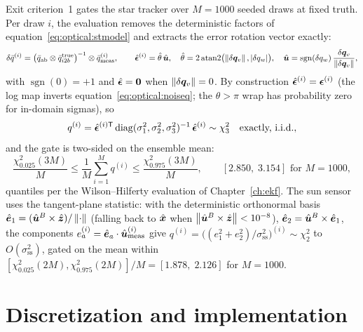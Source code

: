 Exit criterion~1 gates the star tracker over $M = 1000$ seeded draws at
fixed truth. Per draw $i$, the evaluation removes the deterministic
factors of equation~\eqref{eq:optical:stmodel} and extracts the error
rotation vector exactly:
\begin{equation}
  \delta\bar{q}^{(i)}
    = \bigl(\bar{q}_{\mathrm{ab}} \otimes
        \bar{q}_{i2b}^{\mathrm{true}}\bigr)^{-1}
      \otimes \bar{q}_{\mathrm{meas}}^{(i)},
  \qquad
  \hat{\bm{\epsilon}}^{(i)}
    = \hat\theta\,\hat{\bm{u}},\quad
  \hat\theta = 2\operatorname{atan2}\bigl(\left\lVert \delta\bm{q}_v \right\rVert,
    |\delta q_w|\bigr),\quad
  \hat{\bm{u}} = \operatorname{sgn}(\delta q_w)\,
    \frac{\delta\bm{q}_v}{\left\lVert \delta\bm{q}_v \right\rVert},
  \label{eq:optical:extract}
\end{equation}
with $\operatorname{sgn}(0) = +1$ and $\hat{\bm{\epsilon}} = \bm{0}$
when $\left\lVert \delta\bm{q}_v \right\rVert = 0$. By construction
$\hat{\bm{\epsilon}}^{(i)} = \bm{\epsilon}^{(i)}$ (the log map inverts
equation~\eqref{eq:optical:noiseq}; the $\theta > \pi$ wrap has
probability zero for in-domain sigmas), so
\begin{equation}
  q^{(i)} = \hat{\bm{\epsilon}}^{(i)\mathsf T}\,
    \mathrm{diag}(\sigma_1^2, \sigma_2^2, \sigma_3^2)^{-1}\,
    \hat{\bm{\epsilon}}^{(i)} \sim \chi^2_3
  \quad\text{exactly, i.i.d.},
  \label{eq:optical:ststat}
\end{equation}
and the gate is two-sided on the ensemble mean:
\begin{equation}
  \frac{\chi^2_{0.025}(3M)}{M}
    \le \frac{1}{M}\sum_{i=1}^{M} q^{(i)}
    \le \frac{\chi^2_{0.975}(3M)}{M},
  \qquad
  [2.850,\; 3.154] \text{ for } M = 1000 ,
  \label{eq:optical:stbounds}
\end{equation}
quantiles per the Wilson--Hilferty evaluation of
Chapter~\ref{ch:ekf}. The sun sensor uses the tangent-plane statistic:
with the deterministic orthonormal basis $\hat{\bm{e}}_1 =
(\hat{\bm{u}}^{B} \times \hat{\bm{z}})/\left\lVert \cdot \right\rVert$ (falling back to
$\hat{\bm{x}}$ when $\left\lVert \hat{\bm{u}}^{B} \times \hat{\bm{z}} \right\rVert <
10^{-8}$), $\hat{\bm{e}}_2 = \hat{\bm{u}}^{B} \times \hat{\bm{e}}_1$,
the components $e_a^{(i)} = \hat{\bm{e}}_a \cdot
\hat{\bm{u}}_{\mathrm{meas}}^{(i)}$ give $q^{(i)} = \bigl((e_1^2 +
e_2^2)/\sigma_{\mathrm{ss}}^2\bigr)^{(i)} \sim \chi^2_2$ to
$O(\sigma_{\mathrm{ss}}^2)$, gated on the mean within
$[\chi^2_{0.025}(2M), \chi^2_{0.975}(2M)]/M = [1.878,\; 2.126]$ for
$M = 1000$.

\section{Discretization and implementation}
\label{sec:optical:implementation}

